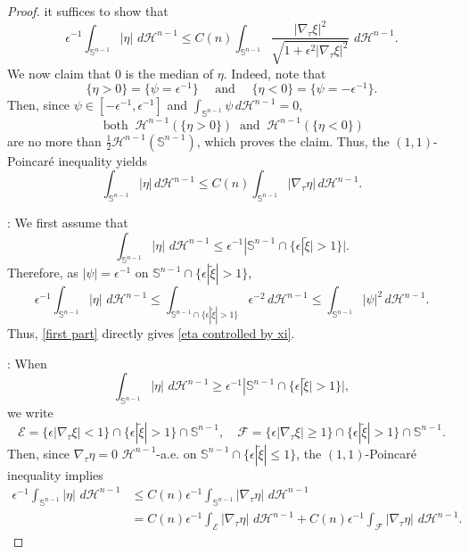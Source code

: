 \documentclass[10pt,a4paper]{amsart}
\def\ez{\epsilon}
\begin{document}
\begin{proof}
it suffices to show that
\begin{equation} \label{eta controlled by xi}
\ez^{-1}\int_{\mathbb S^{n-1}} |\eta|  \, \,d\mathscr H^{n-1}\le C(n)\int_{\mathbb S^{n-1}}   \frac{|\nabla_\tau  \xi|^2}{\sqrt{1+\ez^2|\nabla_\tau \xi|^2}}  \, \,d\mathscr H^{n-1}.
\end{equation}
We now claim that $0$ is the median of $\eta$. Indeed, note that
$$
\{\eta>0\}=\{\psi= \epsilon^{-1}\} \quad \text{  and }\quad  \{\eta<0\}=\{\psi=-\epsilon^{-1}\}.
$$
Then, since $\psi\in [-\epsilon^{-1},  \epsilon^{-1}]$ and $\int_{\mathbb S^{n-1}}\psi\,d\mathscr H^{n-1}=0$,   
$$ \text{ both }  \ \mathscr H^{n-1}(\{\eta>0\}) \ \text{ and } \ \mathscr H^{n-1}(\{\eta<0\})$$ 
are no more than  $\frac 1 2\mathscr H^{n-1}(\mathbb S^{n-1})$, which proves the claim. Thus,  the $(1,1)$-Poincar\'e inequality yields
$$
\int_{\mathbb S^{n-1}} |\eta| \,d\mathscr H^{n-1}
\le C(n)\int_{\mathbb S^{n-1}} |\nabla_\tau\eta|\,d\mathscr H^{n-1}.
$$

\medskip
{}:
We first assume that
\begin{equation}\label{eta small}
\int_{\mathbb S^{n-1}} |\eta|  \, \,d\mathscr H^{n-1}\le \ez^{-1}|\mathbb S^{n-1}\cap \{\ez|\tilde\xi|>1\}|.
\end{equation}
Therefore, as $|\psi|=\ez^{-1}$ on $\mathbb S^{n-1}\cap\{\ez |\tilde\xi|> 1\}$,
\begin{equation}\label{eta small2}
\ez^{-1}\int_{\mathbb S^{n-1}} |\eta|  \, \,d\mathscr H^{n-1}\leq
\int_{\mathbb S^{n-1}\cap\{\ez|\tilde\xi|>1\}}  \ez^{-2} \,d\mathscr H^{n-1}\leq \int_{\mathbb S^{n-1}}  {|\psi|^2}  \,d\mathscr H^{n-1}.
\end{equation}
Thus, \eqref{first part} directly gives \eqref{eta controlled by xi}.

\medskip
{}:
When
\begin{equation}\label{eta large}
\int_{\mathbb S^{n-1}} |\eta|  \, \,d\mathscr H^{n-1}\ge \ez^{-1}|\mathbb S^{n-1}\cap\{\ez|\tilde\xi|>1\}|,
\end{equation}
we write
$$\mathcal E= \{\ez|\nabla_\tau\xi|<1\}\cap\{\ez|\tilde\xi|>1\}\cap\mathbb S^{n-1}, \quad  \mathcal F= \{\ez|\nabla_\tau\xi|\ge 1\}\cap\{\ez|\tilde\xi|>1\}\cap\mathbb S^{n-1}.$$
Then, since $\nabla_\tau\eta=0$ $\mathscr H^{n-1}$-a.e. on $\mathbb S^{n-1}\cap \{\ez|\tilde\xi|\leq  1\}$, the $(1,1)$-Poincar\'e inequality implies
\begin{equation}
    \begin{split}
\ez^{-1}\int_{\mathbb S^{n-1}} |\eta|  \, \,d\mathscr H^{n-1} & \leq  C(n) \ez^{-1} \int_{\mathbb S^{n-1} }  |\nabla_\tau \eta| \, \,d\mathscr H^{n-1}\\
& =  C(n) \ez^{-1} \int_{\mathcal E}  |\nabla_\tau \eta| \, \,d\mathscr H^{n-1}+ C(n) \ez^{-1} \int_{\mathcal F}  |\nabla_\tau \eta| \, \,d\mathscr H^{n-1}. \label{D eta}
    \end{split}
\end{equation}


\end{proof}
\end{document}
